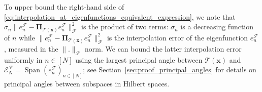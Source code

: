 \documentclass[twoside,11pt]{book}
\newtheorem{theorem}{Theorem}
\numberwithin{theorem}{chapter}
\numberwithin{definition}{chapter}
\numberwithin{proposition}{chapter}
\numberwithin{corollary}{chapter}
\numberwithin{example}{chapter}
\numberwithin{lemma}{chapter}
\numberwithin{assumption}{chapter}
\DeclareMathOperator{\Span}{\mathrm{Span}}
\DeclareMathOperator{\F}{\mathcal{F}}
\begin{document}
To upper bound the right-hand side of \eqref{eq:interpolation_at_eigenfunctions_equivalent_expression}, we note that $\sigma_{n} \|e_{n}^{\F} - \bm{\Pi}_{\mathcal{T}(\bm{x})} e_{n}^{\F}\|_{\mathcal{F}}^{2}$ is the product of two terms: $\sigma_{n}$ is a decreasing function of $n$ while $\|e_{n}^{\F} - \bm{\Pi}_{\mathcal{T}(\bm{x})} e_{n}^{\F}\|_{\mathcal{F}}^{2}$ is the interpolation error of the eigenfunction $e_{n}^{\mathcal{F}}$, measured in the $\|.\|_{\mathcal{F}}$ norm.
We can bound the latter interpolation error uniformly in $n\in [N]$ using the largest principal angle between $\mathcal{T}(\bm{x})$ and $\mathcal{E}^{\mathcal{F}}_{N} = \Span(e_{n}^{\mathcal{F}})_{ n \in [N]}$; see Section~\ref{sec:proof_principal_angles} for details on principal angles between subspaces in Hilbert spaces. 
\end{document}
